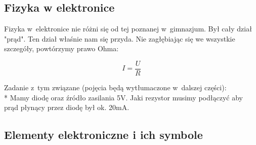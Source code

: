 \documentclass[a4paper,12pt, twoside]{article}
\begin{document}
 \subsection{Fizyka w elektronice}
	Fizyka w~elektronice nie różni się od tej poznanej w~gimnazjum. Był cały dział "prąd". Ten dział właśnie nam się przyda. Nie zagłębiając się we wszystkie szczegóły, powtórzymy prawo Ohma:
	\begin{center}
	\[
	I=\frac{U}{R}
	\]	
	\end{center}
Zadanie z~tym związane (pojęcia będą wytłumaczone w~dalszej części): \\* Mamy diodę oraz źródło zasilania 5V. Jaki rezystor musimy podłączyć aby prąd płynący przez diodę był ok. 20mA. %
	\subsection{Elementy elektroniczne i ich symbole}
\end{document}
